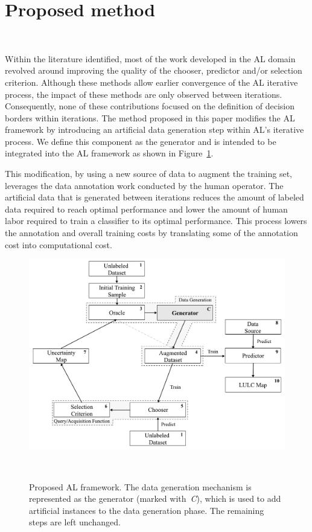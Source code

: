 \documentclass[preprint,12pt]{elsarticle}
\begin{document}
\section{Proposed method}~\label{sec:proposed-method}

Within the literature identified, most of the work developed in the AL domain
revolved around improving the quality of the chooser, predictor and/or
selection criterion. Although these methods allow earlier convergence of the AL
iterative process, the impact of these methods are only observed between
iterations. Consequently, none of these contributions focused on the
definition of decision borders within iterations. The method proposed in this
paper modifies the AL framework by introducing an artificial data generation
step within AL's iterative process. We define this component as the generator
and is intended to be integrated into the AL framework as shown in
Figure~\ref{fig:al_new}. 

This modification, by using a new source of data to augment the training set,
leverages the data annotation work conducted by the human operator. The
artificial data that is generated between iterations reduces the amount of
labeled data required to reach optimal performance and lower the amount of
human labor required to train a classifier to its optimal performance. This
process lowers the annotation and overall training costs by translating some
of the annotation cost into computational cost.

\begin{figure}[htb]
	\centering
	\includegraphics[width=\linewidth]{../analysis/al_new}
    \caption{Proposed AL framework. The data generation mechanism is
        represented as the generator (marked with~\textit{C}), which is used to add artificial
        instances to the data generation phase. The remaining steps are left
        unchanged.
    }~\label{fig:al_new}
\end{figure}
\end{document}

